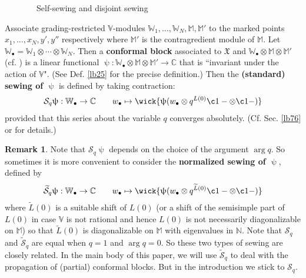\documentclass[11pt,b5paper,notitlepage]{article}
\theoremstyle{definition}
\newtheorem{rem}[df]{Remark}
\theoremstyle{plain}
\newcommand{\mc}{\mathcal}
\newcommand{\wtd}{\widetilde}
\newcommand{\blt}{\bullet}
\newcommand{\Vbb}{\mathbb V}
\newcommand{\Wbb}{\mathbb W}
\newcommand{\Mbb}{\mathbb M}
\newcommand{\Cbb}{\mathbb C}
\newcommand{\Nbb}{\mathbb N}
\newcommand{\<}{\left\langle}
\renewcommand{\>}{\right\rangle}
\newcommand{\fx}{\mathfrak{X}}
\numberwithin{equation}{section}
\begin{document}
\begin{figure}[h]
{


}
	\caption{~~Self-sewing and disjoint sewing}
	\label{fig2}
\end{figure}

Associate grading-restricted $\Vbb$-modules $\Wbb_1,\dots,\Wbb_N,\Mbb,\Mbb'$ to the marked points $x_1,\dots,x_N,y',y''$ respectively where $\Mbb'$ is the contragredient module of $\Mbb$. Let $\Wbb_\blt=\Wbb_1\otimes\cdots\otimes\Wbb_N$. Then a \textbf{conformal block} associated to $\fx$ and $\Wbb_\blt\otimes\Mbb\otimes\Mbb'$ (cf. \cite{Zhu-global,FB04}) is a linear functional $\uppsi:\Wbb_\blt\otimes\Mbb\otimes\Mbb'\rightarrow\Cbb$ that is ``invariant under the action of $\Vbb$". (See Def. \ref{lb25} for the precise definition.) Then the \textbf{(standard) sewing of $\uppsi$} is defined by taking contraction:
\begin{gather}
\mc S_q\uppsi:\Wbb_\blt\rightarrow\Cbb\qquad w_\blt\mapsto \wick{\uppsi(w_\blt\otimes q^{L(0)}\c1-\otimes \c1-)}
\end{gather}
provided that this series about the variable $q$ converges absolutely. (Cf. Sec. \ref{lb76} or \cite[Sec. 10]{Gui-sewingconvergence} for details.)

\begin{rem}
Note that $\mc S_q\uppsi$ depends on the choice of the argument $\arg q$. So sometimes it is more convenient to consider the \textbf{normalized sewing of $\uppsi$}, defined by
\begin{gather}
\wtd{\mc S}_q\uppsi:\Wbb_\blt\rightarrow\Cbb\qquad w_\blt\mapsto \wick{\uppsi(w_\blt\otimes q^{\wtd L(0)}\c1-\otimes \c1-)}
\end{gather}
where $\wtd L(0)$ is a suitable shift of $L(0)$ (or a shift of the semisimple part of $L(0)$ in case $\Vbb$ is not rational and hence $L(0)$ is not necessarily diagonalizable on $\Mbb$) so that $\wtd L(0)$ is diagonalizable on $\Mbb$ with eigenvalues in $\Nbb$. Note that $\mc S_q$ and $\wtd{\mc S}_q$ are equal when $q=1$ and $\arg q=0$. So these two types of sewing are closely related. In the main body of this paper, we will use $\wtd{\mc S}_q$ to deal with the propagation of (partial) conformal blocks. But in the introduction we stick to $\mc S_q$.
\end{rem}
\end{document}
